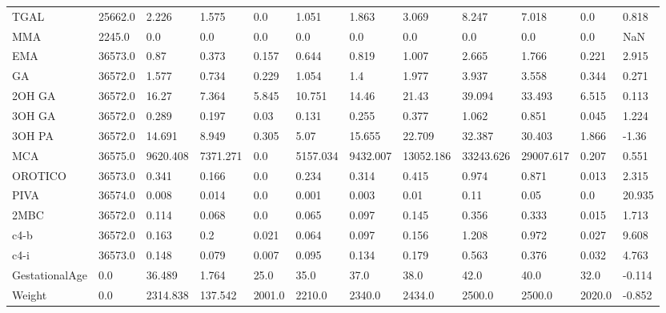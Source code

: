 \begin{tabular}{|l|l|l|l|l|l|l|l|l|l|l|l|}
TGAL & 25662.0 & 2.226 & 1.575 & 0.0 & 1.051 & 1.863 & 3.069 & 8.247 & 7.018 & 0.0 & 0.818 \\
MMA & 2245.0 & 0.0 & 0.0 & 0.0 & 0.0 & 0.0 & 0.0 & 0.0 & 0.0 & 0.0 & NaN \\
EMA & 36573.0 & 0.87 & 0.373 & 0.157 & 0.644 & 0.819 & 1.007 & 2.665 & 1.766 & 0.221 & 2.915 \\
GA & 36572.0 & 1.577 & 0.734 & 0.229 & 1.054 & 1.4 & 1.977 & 3.937 & 3.558 & 0.344 & 0.271 \\
2OH GA & 36572.0 & 16.27 & 7.364 & 5.845 & 10.751 & 14.46 & 21.43 & 39.094 & 33.493 & 6.515 & 0.113 \\
3OH GA & 36572.0 & 0.289 & 0.197 & 0.03 & 0.131 & 0.255 & 0.377 & 1.062 & 0.851 & 0.045 & 1.224 \\
3OH PA & 36572.0 & 14.691 & 8.949 & 0.305 & 5.07 & 15.655 & 22.709 & 32.387 & 30.403 & 1.866 & -1.36 \\
MCA & 36575.0 & 9620.408 & 7371.271 & 0.0 & 5157.034 & 9432.007 & 13052.186 & 33243.626 & 29007.617 & 0.207 & 0.551 \\
OROTICO & 36573.0 & 0.341 & 0.166 & 0.0 & 0.234 & 0.314 & 0.415 & 0.974 & 0.871 & 0.013 & 2.315 \\
PIVA & 36574.0 & 0.008 & 0.014 & 0.0 & 0.001 & 0.003 & 0.01 & 0.11 & 0.05 & 0.0 & 20.935 \\
2MBC & 36572.0 & 0.114 & 0.068 & 0.0 & 0.065 & 0.097 & 0.145 & 0.356 & 0.333 & 0.015 & 1.713 \\
c4-b & 36572.0 & 0.163 & 0.2 & 0.021 & 0.064 & 0.097 & 0.156 & 1.208 & 0.972 & 0.027 & 9.608 \\
c4-i & 36573.0 & 0.148 & 0.079 & 0.007 & 0.095 & 0.134 & 0.179 & 0.563 & 0.376 & 0.032 & 4.763 \\
GestationalAge & 0.0 & 36.489 & 1.764 & 25.0 & 35.0 & 37.0 & 38.0 & 42.0 & 40.0 & 32.0 & -0.114 \\
Weight & 0.0 & 2314.838 & 137.542 & 2001.0 & 2210.0 & 2340.0 & 2434.0 & 2500.0 & 2500.0 & 2020.0 & -0.852 \\
\bottomrule
\end{tabular}
